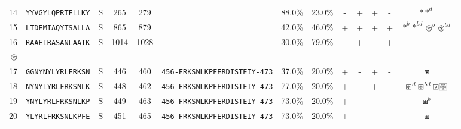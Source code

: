 \begin{tabular}{rcccccccccccc}
14 &  \texttt{YYVGYLQPRTFLLKY} &       S &    265 &   279 &                                                                  &                          88.0\% &                           23.0\% &          - &           + &          + &           - &                                                                                       $ \ast \ast^d $ \\
15 &  \texttt{LTDEMIAQYTSALLA} &       S &    865 &   879 &                                                                  &                          42.0\% &                           46.0\% &          + &           + &          + &           + &                                                   $ \ast^b \ast^{bd} \circledast^b \circledast^{bd} $ \\
16 &  \texttt{RAAEIRASANLAATK} &       S &   1014 &  1028 &                                                                  &                          30.0\% &                           79.0\% &          - &           + &          - &           + &                                 \Centerstack{  $\circ \circ^b \circ^d \circ^{bd}$ \\  $\circledast$ } \\
17 &  \texttt{GGNYNYLYRLFRKSN} &       S &    446 &   460 &  \texttt{{\scriptsize 456-}FRKSNLKPFERDISTEIY{\scriptsize -473}} &                          37.0\% &                           20.0\% &          + &           - &          + &           - &                                                                                           $ \boxast $ \\
18 &  \texttt{NYNYLYRLFRKSNLK} &       S &    448 &   462 &  \texttt{{\scriptsize 456-}FRKSNLKPFERDISTEIY{\scriptsize -473}} &                          77.0\% &                           20.0\% &          + &           - &          + &           - &                 $ \boxast^d \boxast^{bd} \boxcircle \setlength{\fboxsep}{0.5pt} \boxed{\circledast} $ \\
19 &  \texttt{YNYLYRLFRKSNLKP} &       S &    449 &   463 &  \texttt{{\scriptsize 456-}FRKSNLKPFERDISTEIY{\scriptsize -473}} &                          73.0\% &                           20.0\% &          + &           - &          - &           - &                                                                                         $ \boxast^b $ \\
20 &  \texttt{YLYRLFRKSNLKPFE} &       S &    451 &   465 &  \texttt{{\scriptsize 456-}FRKSNLKPFERDISTEIY{\scriptsize -473}} &                          73.0\% &                           20.0\% &          + &           - &          - &           - &                                                                                           $ \boxast $ \\

\end{tabular}
